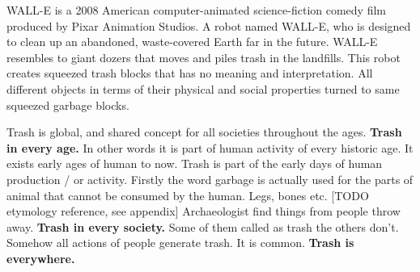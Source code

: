 WALL-E is a 2008 American computer-animated science-fiction comedy film produced by Pixar Animation Studios. A robot named WALL-E, who is designed to clean up an abandoned, waste-covered Earth far in the future. WALL-E resembles to giant dozers that moves and piles trash in the landfills. This robot creates squeezed trash blocks that has no meaning and interpretation. All different objects in terms of their physical and social properties turned to same squeezed garbage blocks.


Trash is global, and shared concept for all societies throughout the ages. 
\textbf{Trash in every age.} In other words it is part of human activity of every historic age. It exists early ages of human to now. Trash is part of the early days of human production / or activity. Firstly the word garbage is actually used for the parts of animal that cannot be consumed by the human. Legs, bones etc. [TODO etymology reference, see appendix] Archaeologist find things from people throw away. 
\textbf{Trash in every society.} Some of them called as trash the others don't. Somehow all actions of people generate trash. It is common. 
\textbf{Trash is everywhere.}





